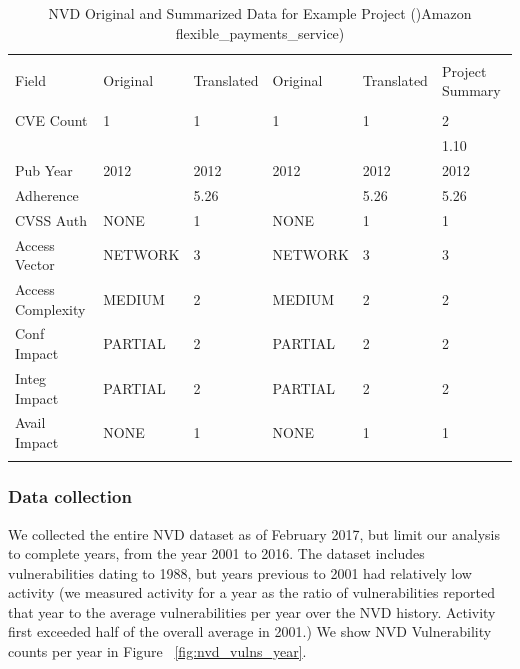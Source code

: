 \begin{table}
	\begin{center}	
		\caption{NVD Original and Summarized Data for Example Project ()Amazon flexible\_payments\_service)}
		\label{tab:nvd_data_examples}
		\begin{scriptsize}
			\begin{tabular}{p{3cm}p{1.5cm}p{1cm}p{1.5cm}p{1cm}p{1cm}}
				&&&&&\\[-1.8ex]\hline 
				\hline &&&&\\[-1.8ex] 
				Field & Original & Translated & Original & Translated & Project Summary \\
				\hline &&&&&\\[-1.8ex] 				
				CVE Count &  1 & 1 & 1 & 1 & 2\\
				&&&&& 1.10\\
				Pub Year & 2012 & 2012 & 2012 & 2012 & 2012\\
				Adherence & & 5.26 & & 5.26 & 5.26 \\				
				CVSS Auth & NONE & 1 & NONE & 1 & 1 \\
				Access Vector & NETWORK & 3 & NETWORK & 3 & 3 \\
				Access Complexity & MEDIUM & 2 & MEDIUM & 2 & 2 \\
				Conf Impact & PARTIAL & 2 & PARTIAL & 2 & 2\\
				Integ Impact & PARTIAL & 2 & PARTIAL & 2 & 2\\
				Avail Impact & NONE & 1 & NONE & 1 & 1 \\
				\hline &&&&&\\[-1.8ex] 				
			\end{tabular}
		\end{scriptsize}
	\end{center}
\end{table}
			
			
\subsubsection{Data collection}
We collected the entire NVD dataset as of February 2017, but limit our analysis to complete years, from the year 2001 to 2016. The dataset includes vulnerabilities dating to 1988, but years previous to 2001 had relatively low activity (we measured activity for a year as the ratio of vulnerabilities reported that year to the average vulnerabilities per year over the NVD history. Activity first exceeded half of the overall average in 2001.) We show NVD Vulnerability counts per year in Figure ~\ref{fig:nvd_vulns_year}.

